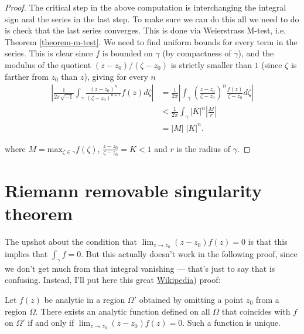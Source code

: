 \begin{proof}
\noindent
The critical step in the above computation
is interchanging the integral sign and the
series in the last step.
To make sure we can do this all we need to do
is check
that the last series converges.
This is done via Weierstrass M-test, i.e.
Theorem \ref{theorem-m-test}.
We need to find uniform bounds for every term
in the series.
This is clear since $f$ is bounded on
$\gamma$ (by compactness of $\gamma$),
and the modulus of the quotient
$(z-z_0)/(\zeta-z_0)$ is strictly smaller
than $1$
(since $\zeta$ is farther from $z_0$ than
$z$), giving
for every $n$
$$
\begin{aligned}
\left| \frac{1}{2\pi\sqrt{-1}}
\int_\gamma\frac{(z-z_0)^n}{(\zeta-z_0)^{n+1}
}f(z)d\zeta\right|
&=\frac{1}{2\pi}\left|
\int_\gamma\left(\frac{z-z_0}{\zeta-z_0}
\right)^n\frac{f(z)}{\zeta-z_0}
d\zeta\right|\\
&< \frac{1}{2\pi}\int_\gamma |K|^n
\left|\frac{M}{r}\right|\\
&=|M|\;|K|^n.
\end{aligned}
$$

\noindent
where $M=\text{max}_{\zeta \in
\gamma}f(\zeta)$,
$\frac{z-z_0}{\zeta-z_0}=K<1$ and $r$ is the
radius of $\gamma$.
\end{proof}
\section{Riemann removable singularity
theorem}
\label{section-removable-singularity}

\noindent
The upshot about the condition that
$\lim_{z \to z_0} (z-z_0)f(z)=0$ is that this
implies
that $\int_\gamma f=0$. But this actually
doesn't
work in the following proof, since we don't
get much from that
integral vanishing --- that's just to say
that
\cite[Chapter 4, Theorem 7]{Ahlfors} is
confusing.
Instead, I'll put here this great
\href{https://en.wikipedia.org/wiki/%
Removable_singularity}{Wikipedia})
proof:

\begin{theorem}
\label{theorem-removable-singularity}
Let $f(z)$ be analytic in a region $\Omega'$
obtained by omitting a point $z_0$
from a region $\Omega$. There exists an
analytic function  defined on all
$\Omega$ that coincides with $f$ on $\Omega'$
if and only if
$\lim_{z \to z_0} (z-z_0)f(z)=0$. Such a
function is unique.
\end{theorem}

